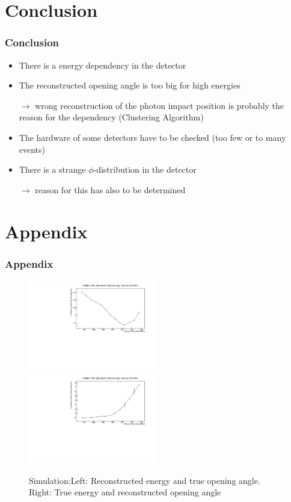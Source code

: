 \documentclass[slidestop,compress,mathserif]{beamer}
\begin{document}
\section{Conclusion}
\begin{frame}
	\frametitle{Conclusion}
	\begin{itemize}
		\item There is a energy dependency in the detector
		\item The reconstructed opening angle is too big for high energies
		
		$\rightarrow$ wrong reconstruction of the photon impact position is probably the reason for the dependency (Clustering Algorithm) 
		\item The hardware of some detectors have to be checked (too few or to many events)
		\item There is a strange $\phi$-distribution in the detector
		
		$\rightarrow$ reason for this has also to be determined
	\end{itemize}
\end{frame}
\section{Appendix}
\begin{frame}
	\frametitle{Appendix}
	
	\begin{figure}
		\includegraphics[width=0.5\textwidth]{Pictures/20170724RecETrueOAngle}
		\includegraphics[width=0.5\textwidth]{Pictures/20170724TrueERecOAngle}
		\caption{Simulation:Left: Reconstructed energy and true opening angle. Right: True energy and reconstructed opening angle}
	\end{figure}
\end{frame}
\end{document}

